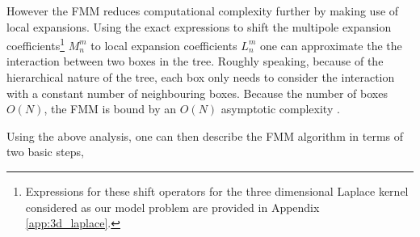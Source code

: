 However the FMM reduces computational complexity further by making use of local
expansions. Using the exact expressions to shift the multipole expansion
coefficients\footnote{Expressions for these shift operators for the three dimensional
Laplace kernel considered as our model problem are provided in Appendix \ref{app:3d_laplace}.}
$M_n^m$ to local expansion coefficients $L_n^m$ one can approximate the the interaction
between two boxes in the tree. Roughly speaking, because of the hierarchical
nature of the tree, each box only needs to consider the interaction with a
constant number of neighbouring boxes. Because the number of boxes $O(N)$,
the FMM is bound by an $O(N)$ asymptotic complexity \cite{Hwu:2011:MKP}.

Using the above analysis, one can then describe the FMM algorithm in terms of
two basic steps,

